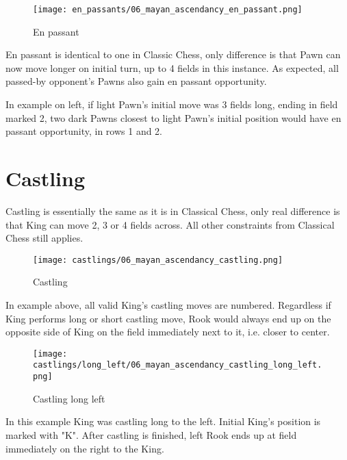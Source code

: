\noindent
\begin{wrapfigure}{l}{0.4\textwidth}
\texttt{[image: en\_passants/06\_mayan\_ascendancy\_en\_passant.png]}
\caption{En passant}
\label{fig:06_mayan_ascendancy_en_passant}
\end{wrapfigure}
En passant is identical to one in Classic Chess, only difference is that Pawn can now
move longer on initial turn, up to 4 fields in this instance. As expected, all passed-by
opponent's Pawns also gain en passant opportunity.

In example on left, if light Pawn's initial move was 3 fields long, ending in field marked
2, two dark Pawns closest to light Pawn's initial position would have en passant opportunity,
in rows 1 and 2.

\clearpage %

\section*{Castling}

Castling is essentially the same as it is in Classical Chess, only real difference is that
King can move 2, 3 or 4 fields across. All other constraints from Classical Chess still
applies.

\noindent
\begin{figure}[!h]
\texttt{[image: castlings/06\_mayan\_ascendancy\_castling.png]}
\caption{Castling}
\label{fig:06_mayan_ascendancy_castling}
\end{figure}

In example above, all valid King's castling moves are numbered. Regardless if King performs
long or short castling move, Rook would always end up on the opposite side of King on the
field immediately next to it, i.e. closer to center.

\noindent
\begin{figure}[!h]
\texttt{[image: castlings/long\_left/06\_mayan\_ascendancy\_castling\_long\_left.png]}
\caption{Castling long left}
\label{fig:06_mayan_ascendancy_castling_long_left}
\end{figure}

In this example King was castling long to the left. Initial King's position is marked with "K".
After castling is finished, left Rook ends up at field immediately on the right to the King.

